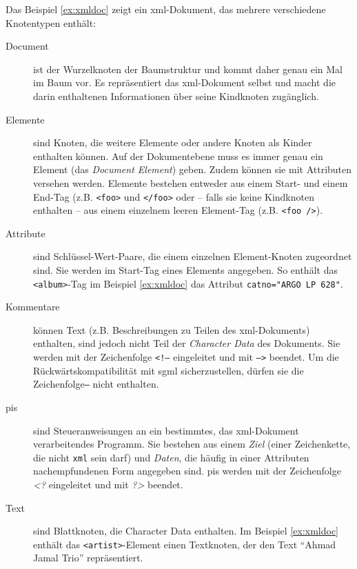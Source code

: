 Das Beispiel \ref{ex:xmldoc} zeigt ein \acrshort{xml}-Dokument, das mehrere verschiedene Knotentypen enthält:

\begin{description}
    \item[Document] ist der Wurzelknoten der Baumstruktur und kommt daher genau ein Mal im Baum vor. Es repräsentiert das \acrshort{xml}-Dokument selbst und macht die darin enthaltenen Informationen über seine Kindknoten zugänglich.~\cite[Abschnitt 2.1]{xmlinfoset}
    \item[Elemente] sind Knoten, die weitere Elemente oder andere Knoten als Kinder enthalten können. Auf der Dokumentebene muss es immer genau ein Element (das \emph{Document Element}) geben. Zudem können sie mit Attributen versehen werden. Elemente bestehen entweder aus einem Start- und einem End-Tag (z.B. \texttt{<foo>} und \texttt{</foo>} oder -- falls sie keine Kindknoten enthalten -- aus einem einzelnem leeren Element-Tag (z.B. \texttt{<foo />}).
    \item[Attribute] sind Schlüssel-Wert-Paare, die einem einzelnen Element-Knoten zugeordnet sind. Sie werden im Start-Tag eines Elements angegeben. So enthält das \texttt{<album>}-Tag im Beispiel \ref{ex:xmldoc} das Attribut \texttt{catno="ARGO LP 628"}.
    \item[Kommentare] können Text (z.B. Beschreibungen zu Teilen des \acrshort{xml}-Dokuments) enthalten, sind jedoch nicht Teil der \emph{Character Data} des Dokuments. Sie werden mit der Zeichenfolge \texttt{<!--} eingeleitet und mit \texttt{-->} beendet. Um die Rückwärtskompatibilität mit \acrshort{sgml} sicherzustellen, dürfen sie die Zeichenfolge\texttt{--} nicht enthalten.~\cite[Abschnitt 2.5]{maler2008xml}
    \item[\glspl{pi}] sind Steueranweisungen an ein bestimmtes, das \acrshort{xml}-Dokument verarbeitendes Programm. Sie bestehen aus einem \emph{Ziel} (einer Zeichenkette, die nicht \texttt{xml} sein darf) und \emph{Daten}, die häufig in einer Attributen nachempfundenen Form angegeben sind. \glspl{pi} werden mit der Zeichenfolge {\emph{<?}} eingeleitet und mit {\emph{?>}} beendet.~\cite[Abschnitt 2.6]{maler2008xml}
    \item[Text] sind Blattknoten, die Character Data enthalten. Im Beispiel \ref{ex:xmldoc} enthält das \texttt{<artist>}-Element einen Textknoten, der den Text \enquote{Ahmad Jamal Trio} repräsentiert.
\end{description}

